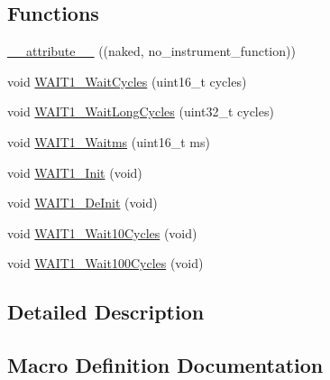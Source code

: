 \subsection*{Functions}
\begin{DoxyCompactItemize}
\item 
\hyperlink{group___w_a_i_t1__module_ga0d401ca6ca297b5b7a450deed0c42b78}{\+\_\+\+\_\+attribute\+\_\+\+\_\+} ((naked, no\+\_\+instrument\+\_\+function))
\item 
void \hyperlink{group___w_a_i_t1__module_ga2ef0c866b014b3f8bba49508c79a4c21}{W\+A\+I\+T1\+\_\+\+Wait\+Cycles} (uint16\+\_\+t cycles)
\item 
void \hyperlink{group___w_a_i_t1__module_gad800b2446f397d9524bf1780d2646a57}{W\+A\+I\+T1\+\_\+\+Wait\+Long\+Cycles} (uint32\+\_\+t cycles)
\item 
void \hyperlink{group___w_a_i_t1__module_ga04b03075f856862ff2bc4ff69825aeb6}{W\+A\+I\+T1\+\_\+\+Waitms} (uint16\+\_\+t ms)
\item 
void \hyperlink{group___w_a_i_t1__module_ga3bb855c4f83a70665404289e66b8f2a7}{W\+A\+I\+T1\+\_\+\+Init} (void)
\item 
void \hyperlink{group___w_a_i_t1__module_ga8024b107f0d8d25c88974c6a709b1f88}{W\+A\+I\+T1\+\_\+\+De\+Init} (void)
\item 
void \hyperlink{group___w_a_i_t1__module_gaff67df7b318b8d5cf4555a24fe7c7f93}{W\+A\+I\+T1\+\_\+\+Wait10\+Cycles} (void)
\item 
void \hyperlink{group___w_a_i_t1__module_gaa9a9a87e96edf43071b5f322cfa72333}{W\+A\+I\+T1\+\_\+\+Wait100\+Cycles} (void)
\end{DoxyCompactItemize}


\subsection{Detailed Description}


\subsection{Macro Definition Documentation}
\mbox{\label{group___w_a_i_t1__module_gad719b8589ad1bf92a03ec94ce95c4804}} 
